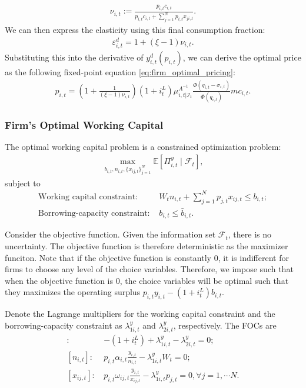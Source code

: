 \documentclass[12pt]{article}
\numberwithin{equation}{section}
\begin{document}
\begin{appendix}
\begin{align*}
    \nu_{i,t} := \frac{p_{i,t}c_{i,t}}{p_{i,t}c_{i,t} + \sum_{j=1}^N p_{i,t}x_{ji,t}}.
\end{align*}
We can then express the elasticity using this final consumption fraction:
\begin{align*}
    \varepsilon^d_{i,t} = 1 + (\xi-1)\nu_{i,t}.
\end{align*}
Substituting this into the derivative of $y^d_{i,t}(p_{i,t})$, we can derive the optimal price as the following fixed-point equation \eqref{eq:firm_optimal_pricing}:
\begin{align*}
    p_{i,t} = \left(1+\frac{1}{(\xi-1)\nu_{i,t}}\right) (1+i^L_t) \mu^{A^{-1}}_{i,t|\mathcal{I}_t} \frac{\Phi(q_{i,t} - \sigma_{i,t})}{\Phi(q_{i,t})} {mc}_{i,t} .
\end{align*}

\subsubsection{Firm's Optimal Working Capital}\label{app:firm_working_capital}
The optimal working capital problem is a constrained optimization problem:
\begin{align*}
    \max_{b_{i,t}, n_{i,t}, \{x_{ij,t}\}_{j=1}^N} \mathbb{E}\left[ \Pi^y_{i,t} \mid \mathcal{F}_t \right],
\end{align*}
subject to
\begin{align*}
    \text{Working capital constraint: } &W_t n_{i,t} + \sum_{j=1}^N p_{j,t} x_{ij,t} \leq  b_{i,t};\\
    \text{Borrowing-capacity constraint: } &b_{i,t} \leq \bar b_{i,t}.
\end{align*}

Consider the objective function. Given the information set $\mathcal{F}_t$, there is no uncertainty. The objective function is therefore deterministic as the maximizer funciton. Note that if the objective function is constantly 0, it is indifferent for firms to choose any level of the choice variables. Therefore, we impose such that when the objective function is 0, the choice variables will be optimal such that they maximizes the operating surplus $p_{i,t} y_{i,t} - (1+i^L_t) b_{i,t}$. 

Denote the Lagrange multipliers for the working capital constraint and the borrowing-capacity constraint as $\lambda^y_{1i,t}$ and $\lambda^y_{2i,t}$, respectively. The FOCs are
\begin{align}
    [b_{i,t}]:\, & -(1+i^L_t) + \lambda^y_{1i,t} - \lambda^y_{2i,t} = 0; \label{eq:foc_b}\\
    [n_{i,t}]:\, & p_{i,t} \alpha_{i,t} \frac{y_{i,t}}{n_{i,t}} - \lambda^y_{1i,t} W_t  = 0; \label{eq:foc_n}\\
    [x_{ij,t}]:\, & p_{i,t} \omega_{ij,t} \frac{y_{i,t}}{x_{ij,t}} - \lambda^y_{1i,t} p_{j,t} = 0, \forall j=1, \cdots N. \label{eq:foc_x}
\end{align}


\end{appendix}
\end{document}
